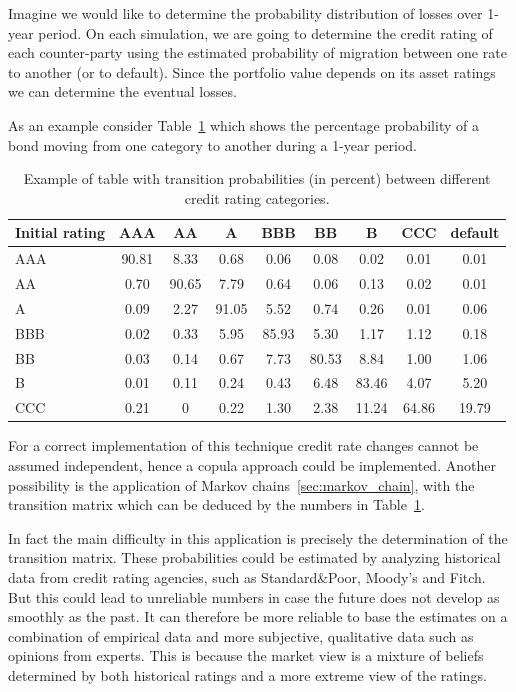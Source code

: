 Imagine we would like to determine the probability distribution of losses over 1-year period. On each simulation, we are going to determine the credit rating of each counter-party using the estimated probability of migration between one rate to another (or to default). Since the portfolio value depends on its asset ratings we can determine the eventual losses. 

As an example consider Table~\ref{tab:credit_ratings} which shows the percentage probability of a bond moving from one category to another during a 1-year period.

\begin{table}[htb]
\centering
\begin{tabular}{|l|c|c|c|c|c|c|c|c|}
\hline
Initial rating & AAA & AA & A & BBB & BB & B & CCC & default \\
\hline
\hline
AAA & 90.81 & 8.33 & 0.68 & 0.06 & 0.08 & 0.02 & 0.01& 0.01 \\ 
\hline
AA & 0.70 & 90.65 & 7.79 & 0.64 & 0.06 & 0.13 & 0.02 & 0.01 \\ 
\hline
A & 0.09 & 2.27 & 91.05 & 5.52 & 0.74 & 0.26 & 0.01 & 0.06 \\ 
\hline
BBB & 0.02 & 0.33 & 5.95 & 85.93 & 5.30 & 1.17 & 1.12 & 0.18 \\
\hline
BB & 0.03 & 0.14 & 0.67 & 7.73 & 80.53 & 8.84 & 1.00 & 1.06 \\
\hline
B & 0.01 & 0.11 & 0.24 & 0.43 & 6.48 & 83.46 & 4.07 & 5.20 \\
\hline
CCC & 0.21 & 0 & 0.22 & 1.30 & 2.38 & 11.24 & 64.86 & 19.79 \\		
\hline
\end{tabular}
\caption{Example of table with transition probabilities (in percent) between different credit rating categories.}
\label{tab:credit_ratings}
\end{table}

For a correct implementation of this technique credit rate changes cannot be assumed independent, hence a copula approach could be implemented.
Another possibility is the application of Markov chains~\ref{sec:markov_chain}, with the transition matrix which can be deduced by the numbers in Table~\ref{tab:credit_ratings}.

In fact the main difficulty in this application is precisely the determination of the transition matrix. These probabilities could be estimated by analyzing historical data from credit rating agencies, such as Standard\&Poor, Moody's and Fitch. But this could lead to unreliable numbers in case the future does not develop as smoothly as the past. It can therefore be more reliable to base the estimates on a combination of empirical data and more subjective, qualitative data such as opinions from experts. This is because the market view is a mixture of beliefs determined by both historical ratings and a more extreme view of the ratings. 

